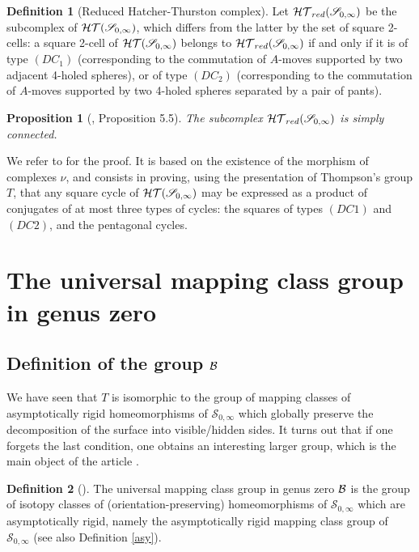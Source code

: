 \documentclass[twoside]{irmaems}
\theoremstyle{plain}
\newtheorem{proposition}[theorem]{Proposition}
\theoremstyle{definition}
\newtheorem{definition}{Definition}[section]
\theoremstyle{remark}
\newcommand{\B}{{{\cal B}}}
\begin{document}
\begin{definition}[Reduced Hatcher-Thurston complex]
Let ${\cal HT}_{red}(\mathscr{S}_{0,\infty})$ be the subcomplex of
  ${\cal HT}(\mathscr{S}_{0,\infty})$, which differs from the latter by the set of square 2-cells: a square 2-cell of ${\cal HT}(\mathscr{S}_{0,\infty})$ belongs to 
  ${\cal HT}_{red}(\mathscr{S}_{0,\infty})$ if and only if it is of type $(DC_1)$ 
  (corresponding to the commutation of $A$-moves supported by two adjacent 4-holed spheres), or of type
   $(DC_2)$ (corresponding to the commutation of $A$-moves 
   supported by two 4-holed spheres 
   separated by a pair of pants).
\end{definition}

\begin{proposition}[\cite{fu-ka1}, Proposition 5.5]
The subcomplex ${\cal HT}_{red}(\mathscr{S}_{0,\infty})$ is simply connected.
\end{proposition}


\vspace{0.1cm}\noindent 
We refer to \cite{fu-ka1} for the proof. It is based on the existence of the morphism of complexes $\nu$, and consists in proving, using the presentation of 
Thompson's group $T$, that any square cycle of ${\cal HT}(\mathscr{S}_{0,\infty})$ may be expressed as a product of conjugates of 
at most three types of cycles: the squares of types $(DC1)$ and $(DC2)$, and the pentagonal cycles.  

\section{The universal mapping class group in genus zero}

\subsection{Definition of the group $\B$} 

We have seen that $T$ is isomorphic to 
the group of mapping classes of asymptotically rigid homeomorphisms of $\mathscr{S}_{0,\infty}$ which globally 
preserve the decomposition of the surface into visible/hidden sides. It turns out that if one forgets the last condition, one obtains an interesting larger 
group, which is the main object of the article \cite{fu-ka1}.

\begin{definition}[\cite{fu-ka1}]
The universal mapping class group in genus zero 
${\cal B}$ is the group of isotopy classes 
of (orientation-preserving) homeomorphisms 
of $\mathscr{S}_{0,\infty}$ which are asymptotically rigid, namely the 
asymptotically rigid mapping class group 
of $\mathscr{S}_{0,\infty}$ 
(see also Definition \ref{asy}).
\end{definition}
\end{document}
